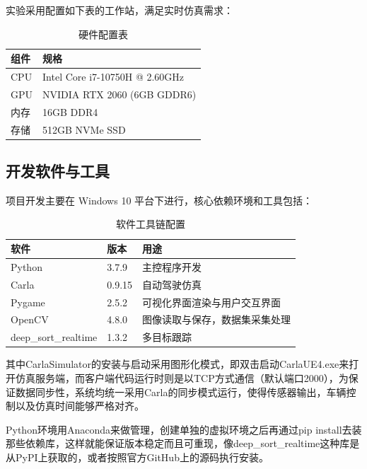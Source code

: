 实验采用配置如下表的工作站，满足实时仿真需求：

\begin{table}[htbp]
  \caption{硬件配置表}
  \label{tab:hardware_config}
  \centering
  \begin{tabular}{ll}
    \toprule
    组件 & 规格 \\
    \midrule
    CPU & Intel Core i7-10750H @ 2.60GHz \\
    GPU & NVIDIA RTX 2060 (6GB GDDR6) \\
    内存 & 16GB DDR4 \\
    存储 & 512GB NVMe SSD \\
    \bottomrule
  \end{tabular}
\end{table}

\subsection{开发软件与工具}

项目开发主要在 Windows 10 平台下进行，核心依赖环境和工具包括：

\begin{table}[htbp]
  \caption{软件工具链配置}
  \label{tab:software_stack}
  \centering
  \begin{tabular}{lll}
    \toprule
    软件 & 版本 & 用途 \\
    \midrule
    Python & 3.7.9 & 主控程序开发 \\
    Carla & 0.9.15 & 自动驾驶仿真 \\
    Pygame & 2.5.2 & 可视化界面渲染与用户交互界面 \\
    OpenCV & 4.8.0 & 图像读取与保存，数据集采集处理 \\
    deep\_sort\_realtime & 1.3.2 & 多目标跟踪 \\
    \bottomrule
  \end{tabular}
\end{table}

其中CarlaSimulator的安装与启动采用图形化模式，即双击启动CarlaUE4.exe来打开仿真服务端，而客户端代码运行时则是以TCP方式通信（默认端口2000），为保证数据同步性，系统均统一采用Carla的同步模式运行，使得传感器输出，车辆控制以及仿真时间能够严格对齐。

Python环境用Anaconda来做管理，创建单独的虚拟环境之后再通过pip install去装那些依赖库，这样就能保证版本稳定而且可重现，像deep\_sort\_realtime这种库是从PyPI上获取的，或者按照官方GitHub上的源码执行安装。





\begin{tabular}{l l}
\end{tabular}
